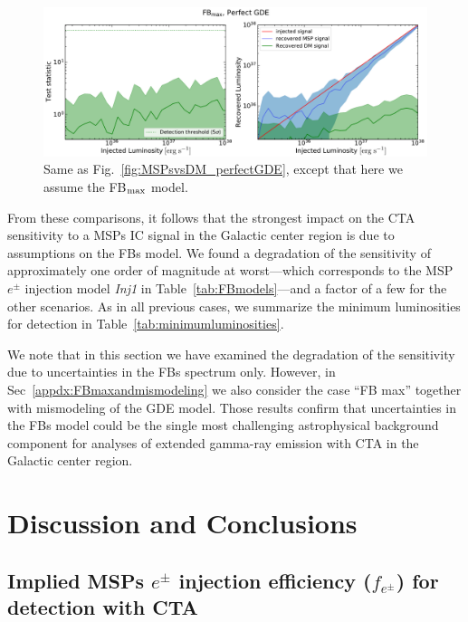 \documentclass[doublespace,nopageskip]{VTthesis} %
\begin{document}
\begin{figure}[htb]
    \begin{center}
    \includegraphics[width=\textwidth]{Figures/CTA/TS-dm-mis-False-Fermi-min-False.pdf}
\caption{Same as Fig.~\ref{fig:MSPsvsDM_perfectGDE}, except that here we assume the FB$_{\rm max}$ model.}\label{fig:MSPsvsDM_perfectGDEFBmax}
    \end{center}
\end{figure}

From these comparisons, it follows that the strongest impact on the CTA sensitivity to a MSPs IC signal in the Galactic center region is due to assumptions on the FBs model. We found a degradation of the sensitivity of approximately one order of magnitude at worst---which corresponds to the MSP $e^\pm$ injection model \textit{Inj1} in Table~\ref{tab:FBmodels}---and a factor of a few for the other scenarios. As in all previous cases, we summarize the minimum luminosities for detection in Table~\ref{tab:minimumluminosities}.  

We note that in this section we have examined the degradation of the sensitivity due to uncertainties in the FBs spectrum only. However, in Sec~\ref{appdx:FBmaxandmismodeling} we also consider the case ``FB max'' together with  mismodeling of the GDE model. Those results confirm that uncertainties in the FBs model could be the single most challenging astrophysical background component for analyses of extended gamma-ray emission with CTA in the Galactic center region.     

\section{Discussion and Conclusions}
\label{sec:discussions_CTA}

\subsection{Implied MSPs $e^\pm$ injection efficiency ($f_{e^\pm}$) for detection with CTA}
\label{sec:efficiency}
\end{document}
